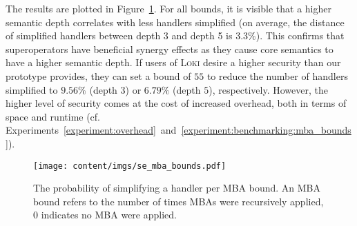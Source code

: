 \documentclass[letterpaper,twocolumn,10pt]{article}
\newcommand{\cf}{cf.\xspace}
\theoremstyle{customexample}
\theoremstyle{customexperiment}
\newcommand{\loki}{\textsc{Loki}\xspace}
\begin{document}
The results are plotted in Figure~\ref{fig:se_mba_bounds_appendix}. 
For all bounds, it is visible that a higher semantic depth correlates with less handlers simplified (on average, the distance of simplified handlers between depth 3 and depth 5 is $3.3\%$). This confirms that superoperators have beneficial synergy effects as they cause core semantics to have a higher semantic depth.
If users of \loki desire a higher security than our prototype provides, they can set a bound of $55$ to reduce the number of handlers simplified to $9.56\%$ (depth 3) or $6.79\%$ (depth $5$), respectively. However, the higher level of security comes at the cost of increased overhead, both in terms of space and runtime (\cf Experiments~\ref{experiment:overhead}~and~\ref{experiment:benchmarking:mba_bounds}).

\begin{figure}[htb]
\centering
    \texttt{[image: content/imgs/se\_mba\_bounds.pdf]}
    \caption{The probability of simplifying a handler per MBA bound. An MBA bound refers to the number of times MBAs were recursively applied, 0 indicates no MBA were applied.}\label{fig:se_mba_bounds_appendix}\end{figure} 
\end{document}
